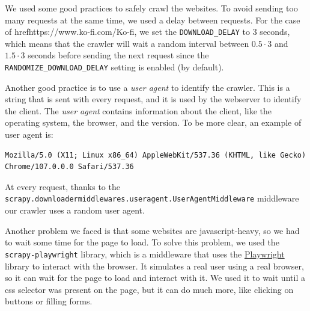 \documentclass[tikz,14pt]{article}
\begin{document}
We used some good practices to safely crawl the websites. To avoid sending too many requests at the same time, we used a delay between requests.
For the case of href{https://www.ko-fi.com/}{Ko-fi}, we set the \texttt{DOWNLOAD_DELAY} to 3 seconds,
which means that the crawler will wait a random interval between $0.5 \cdot 3$ and $1.5 \cdot 3$ seconds 
before sending the next request since the \texttt{RANDOMIZE_DOWNLOAD_DELAY} setting is enabled (by default).

Another good practice is to use a \textit{user agent} to identify the crawler.
This is a string that is sent with every request, and it is used by the webserver to identify the client.
The \textit{user agent} contains information about the client, like the operating system, the browser, and the version.
To be more clear, an example of user agent is: 
\begin{verbatim}
Mozilla/5.0 (X11; Linux x86_64) AppleWebKit/537.36 (KHTML, like Gecko) Chrome/107.0.0.0 Safari/537.36
\end{verbatim}
At every request, thanks to the \texttt{scrapy.downloadermiddlewares.useragent.UserAgentMiddleware} middleware
our crawler uses a random user agent.

Another problem we faced is that some websites are javascript-heavy, so we had to wait some time for the page to load.
To solve this problem, we used the \verb|scrapy-playwright| library, which is a middleware that uses the \href{https://playwright.dev/}{Playwright} library to interact with the browser.
It simulates a real user using a real browser, so it can wait for the page to load and interact with it. 
We used it to wait until a css selector was present on the page, but it can do much more, like clicking on buttons or filling forms.
\end{document}
